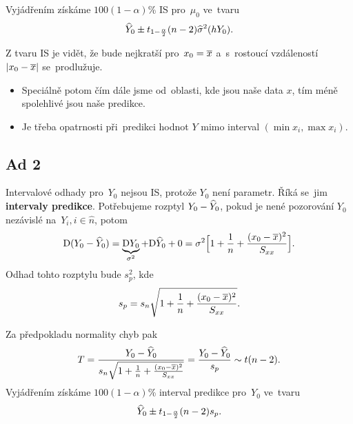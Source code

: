 	Vyjádřením získáme $100(1-\alpha)$\% IS pro~$\mu_0$ ve~tvaru $$ \widehat{Y}_0\pm t_{1-\frac{\alpha}{2}}(n-2)\widehat{\sigma}^2(hY_0). $$
	\begin{remark}
		Z tvaru IS je vidět, že bude nejkratší pro~$x_0=\overline{x}$ a~s~rostoucí vzdáleností $| x_0-\overline{x} |$ se~prodlužuje.\begin{itemize}
			\item  Speciálně potom čím dále jsme od~oblasti, kde jsou naše data $x$, tím méně spolehlivé jsou naše predikce. 
			\item Je třeba opatrnosti při~predikci hodnot $Y$ mimo interval $(\min x_i,\max x_i)$.
		\end{itemize}
\end{remark}
\subsection{Ad 2}
Intervalové odhady pro~$Y_0$ nejsou IS, protože $Y_0$ není parametr. Říká se~jim \textbf{intervaly predikce}. Potřebujeme rozptyl $Y_0-\widehat{Y}_0$, pokud je nené pozorování $Y_0$ nezávislé na~$Y_i,i\in\hat{n}$, potom 
$$ \mathrm{D}(Y_0-\widehat{Y}_0)=\underbrace{\mathrm{D} Y_0}_{\sigma^2}+\mathrm{D} \widehat{Y}_0+0=\sigma^2\Big[ 1+\frac{1}{n}+\frac{(x_0-\overline{x})^2}{S_{xx}} \Big].$$ Odhad tohto rozptylu bude $s_p^2$, kde 
$$ s_p=s_n\sqrt{1+\frac{1}{n}+\frac{(x_0-\overline{x})^2}{S_{xx}}}.$$

Za předpokladu normality chyb pak 
$$ T=\frac{Y_0-\widehat{Y}_0}{s_n\sqrt{1+\frac{1}{n}+\frac{(x_0-\overline{x})^2}{S_{xx}}}}=\frac{Y_0-\widehat{Y}_0}{s_p}\sim t(n-2).$$
Vyjádřením získáme $100(1-\alpha)$\% interval predikce pro~$Y_0$ ve~tvaru 
$$ \widehat{Y}_0 \pm t_{1-\frac{\alpha}{2}}(n-2)s_p.$$

